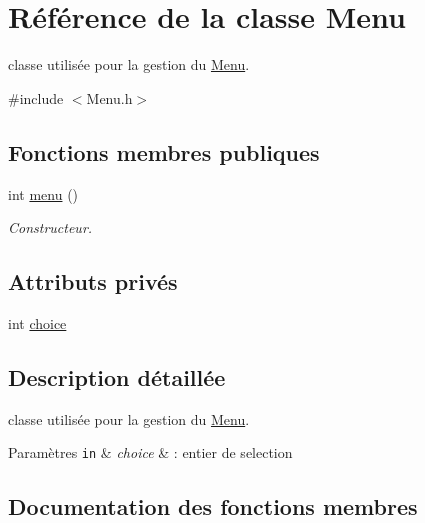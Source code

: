 \hypertarget{class_menu}{}\section{Référence de la classe Menu}
\label{class_menu}


classe utilisée pour la gestion du \hyperlink{class_menu}{Menu}.  




{\ttfamily \#include $<$Menu.\+h$>$}

\subsection*{Fonctions membres publiques}
\begin{DoxyCompactItemize}
\item 
int \hyperlink{class_menu_af53b25cb33a56260f37f38f0e26ea747}{menu} ()
\begin{DoxyCompactList}\small\item\em Constructeur. \end{DoxyCompactList}\end{DoxyCompactItemize}
\subsection*{Attributs privés}
\begin{DoxyCompactItemize}
\item 
int \hyperlink{class_menu_ad5152b40c2819510f9e74600f4b510ad}{choice}
\end{DoxyCompactItemize}


\subsection{Description détaillée}
classe utilisée pour la gestion du \hyperlink{class_menu}{Menu}. 


\begin{DoxyParams}[1]{Paramètres}
\mbox{\tt in}  & {\em choice} & \+: entier de selection \\
\hline
\end{DoxyParams}


\subsection{Documentation des fonctions membres}
\mbox{\label{class_menu_af53b25cb33a56260f37f38f0e26ea747}} 
